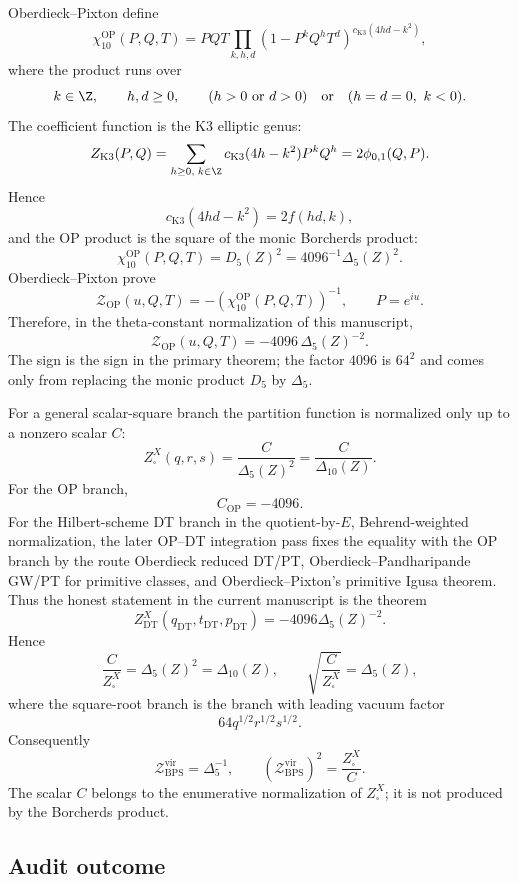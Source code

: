 Oberdieck--Pixton define \cite[(3)]{OB}
$$
\chi_{10}^{\mathrm{OP}}(P,Q,T)
=PQT
\prod_{k,h,d}
(1-P^kQ^hT^d)^{c_{\mathrm{K3}}(4hd-k^2)},
$$
where the product runs over
$$
k\in\Z,\qquad h,d\geq0,\qquad
(h>0\ \hbox{or}\ d>0)\quad\hbox{or}\quad(h=d=0,\ k<0).
$$
The coefficient function is the K3 elliptic genus:
$$
Z_{\mathrm{K3}}(P,Q)
=\sum_{h\geq0,\;k\in\Z}
c_{\mathrm{K3}}(4h-k^2)P^kQ^h
=2\phi_{0,1}(Q,P).
$$
Hence
$$
c_{\mathrm{K3}}(4hd-k^2)=2f(hd,k),
$$
and the OP product is the square of the monic Borcherds product:
$$
\chi_{10}^{\mathrm{OP}}(P,Q,T)=D_5(Z)^2
=4096^{-1}\Delta_5(Z)^2.
$$
Oberdieck--Pixton prove \cite[Theorem 1]{OB}
$$
\mathcal Z_{\mathrm{OP}}(u,Q,T)
=-\left(\chi_{10}^{\mathrm{OP}}(P,Q,T)\right)^{-1},
\qquad P=e^{iu}.
$$
Therefore, in the theta-constant normalization of this manuscript,
$$
\mathcal Z_{\mathrm{OP}}(u,Q,T)
=-4096\,\Delta_5(Z)^{-2}.
$$
The sign is the sign in the primary theorem; the factor $4096$ is
$64^2$ and comes only from replacing the monic product $D_5$ by
$\Delta_5$.

For a general scalar-square branch the partition function is normalized
only up to a nonzero scalar $C$:
$$
Z^X_{\square}(q,r,s)=\frac{C}{\Delta_5(Z)^2}
=\frac{C}{\Delta_{10}(Z)}.
$$
For the OP branch,
$$
C_{\mathrm{OP}}=-4096.
$$
For the Hilbert-scheme DT branch in the quotient-by-\(E\),
Behrend-weighted normalization, the later OP--DT integration pass fixes
the equality with the OP branch by the route
Oberdieck reduced DT/PT, Oberdieck--Pandharipande GW/PT for primitive
classes, and Oberdieck--Pixton's primitive Igusa theorem.  Thus the
honest statement in the current manuscript is the theorem
$$
Z^X_{\mathrm{DT}}(q_{\mathrm{DT}},t_{\mathrm{DT}},p_{\mathrm{DT}})
=-4096\Delta_5(Z)^{-2}.
$$
Hence
$$
\frac{C}{Z^X_{\square}}=\Delta_5(Z)^2=\Delta_{10}(Z),
\qquad
\sqrt{\frac{C}{Z^X_{\square}}}=\Delta_5(Z),
$$
where the square-root branch is the branch with leading vacuum factor
$$
64q^{1/2}r^{1/2}s^{1/2}.
$$
Consequently
$$
\mathcal Z_{\mathrm{BPS}}^{\mathrm{vir}}=\Delta_5^{-1},
\qquad
\left(\mathcal Z_{\mathrm{BPS}}^{\mathrm{vir}}\right)^2
=\frac{Z^X_{\square}}{C}.
$$
The scalar $C$ belongs to the enumerative normalization of
$Z^X_{\square}$; it is not produced by the Borcherds product.

\subsection{Audit outcome}

